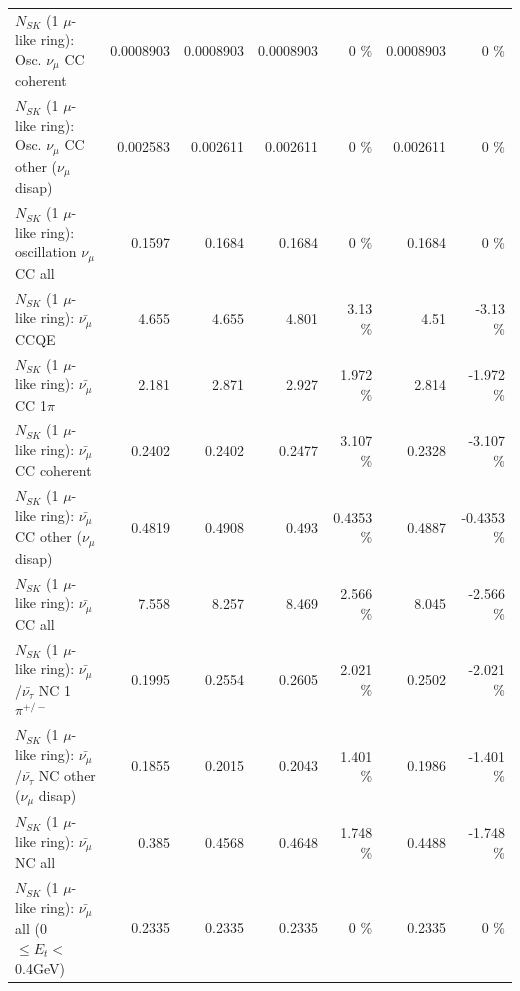 \begin{table}
\begin{tabular}{| l | r | r | r  r | r  r |}
                        $N_{SK}$ (1 $\mu$-like ring): Osc. $\nu_\mu$ CC coherent &       0.0008903 &       0.0008903 &       0.0008903 &        0 \%  &       0.0008903 &        0 \%  \\ 
         $N_{SK}$ (1 $\mu$-like ring): Osc. $\nu_\mu$ CC other ($\nu_\mu$ disap) &        0.002583 &        0.002611 &        0.002611 &        0 \%  &        0.002611 &        0 \%  \\ 
                      $N_{SK}$ (1 $\mu$-like ring): oscillation $\nu_\mu$ CC all &          0.1597 &          0.1684 &          0.1684 &        0 \%  &          0.1684 &        0 \%  \\ 
\hline
\hline
                              $N_{SK}$ (1 $\mu$-like ring): $\bar{\nu_\mu}$ CCQE &           4.655 &           4.655 &           4.801 &     3.13 \%  &            4.51 &    -3.13 \%  \\ 
                         $N_{SK}$ (1 $\mu$-like ring): $\bar{\nu_\mu}$ CC 1$\pi$ &           2.181 &           2.871 &           2.927 &    1.972 \%  &           2.814 &   -1.972 \%  \\ 
                       $N_{SK}$ (1 $\mu$-like ring): $\bar{\nu_\mu}$ CC coherent &          0.2402 &          0.2402 &          0.2477 &    3.107 \%  &          0.2328 &   -3.107 \%  \\ 
        $N_{SK}$ (1 $\mu$-like ring): $\bar{\nu_\mu}$ CC other ($\nu_\mu$ disap) &          0.4819 &          0.4908 &           0.493 &   0.4353 \%  &          0.4887 &  -0.4353 \%  \\ 
                          $N_{SK}$ (1 $\mu$-like ring): $\bar{\nu_{\mu}}$ CC all &           7.558 &           8.257 &           8.469 &    2.566 \%  &           8.045 &   -2.566 \%  \\ 
\hline
  $N_{SK}$ (1 $\mu$-like ring): $\bar{\nu_\mu}$/$\bar{\nu_\tau}$ NC 1$\pi^{+/-}$ &          0.1995 &          0.2554 &          0.2605 &    2.021 \%  &          0.2502 &   -2.021 \%  \\ 
$N_{SK}$ (1 $\mu$-like ring): $\bar{\nu_\mu}$/$\bar{\nu_\tau}$ NC other ($\nu_\mu$ disap) &          0.1855 &          0.2015 &          0.2043 &    1.401 \%  &          0.1986 &   -1.401 \%  \\ 
                          $N_{SK}$ (1 $\mu$-like ring): $\bar{\nu_{\mu}}$ NC all &           0.385 &          0.4568 &          0.4648 &    1.748 \%  &          0.4488 &   -1.748 \%  \\ 
\hline
   $N_{SK}$ (1 $\mu$-like ring): $\bar{\nu_{\mu}}$ all (0 $\leq E_{t} <$ 0.4GeV) &          0.2335 &          0.2335 &          0.2335 &        0 \%  &          0.2335 &        0 \%  \\ 

\end{tabular}
\end{table}
